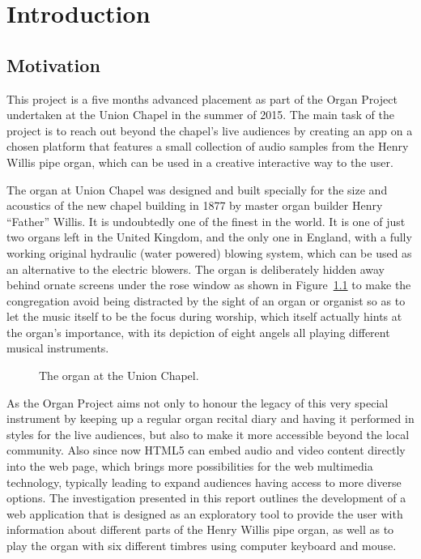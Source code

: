 
\chapter{Introduction}

\section{Motivation}

This project is a five months advanced placement as part of the Organ Project undertaken at the Union Chapel in the summer of 2015. The main task of the project is to reach out beyond the chapel's live audiences by creating an app on a chosen platform that features a small collection of audio samples from the Henry Willis pipe organ, which can be used in a creative interactive way to the user.

The organ at Union Chapel was designed and built specially for the size and acoustics of the new chapel building in 1877 by master organ builder Henry \enquote{Father} Willis. It is undoubtedly one of the finest in the world. It is one of just two organs left in the United Kingdom, and the only one in England, with a fully working original hydraulic (water powered) blowing system, which can be used as an alternative to the electric blowers. The organ is deliberately hidden away behind ornate screens under the rose window as shown in Figure~\ref{fig:interior} to make the congregation avoid being distracted by the sight of an organ or organist so as to let the music itself to be the focus during worship, which itself actually hints at the organ's importance, with its depiction of eight angels all playing different musical instruments.

\begin{figure}
\centerline{}
\caption{The organ at the Union Chapel.} 
\label{fig:interior}
\end{figure}

As the Organ Project aims not only to honour the legacy of this very special instrument by keeping up a regular organ recital diary and having it performed in styles for the live audiences, but also to make it more accessible beyond the local community. Also since now HTML5 can embed audio and video content directly into the web page, which brings more possibilities for the web multimedia technology, typically leading to expand audiences having access to more diverse options. The investigation presented in this report outlines the development of a web application that is designed as an exploratory tool to provide the user with information about different parts of the Henry Willis pipe organ, as well as to play the organ with six different timbres using computer keyboard and mouse.

